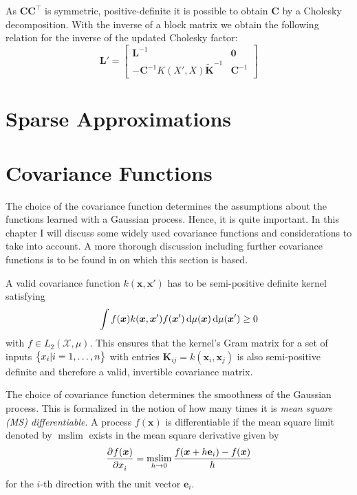 \documentclass[11pt,a4paper]{scrreprt}
\newcommand{\vc}[1]{\bm{#1}}
\newcommand{\vcc}[1]{\textbf{#1}}
\newcommand{\mat}[1]{\bm{#1}}
\newcommand{\T}{^{\top}}
\DeclareMathOperator*{\mslim}{mslim}
\newcommand{\newterm}[1]{\emph{#1}}
\begin{document}
As $\mat C \mat C\T$ is symmetric, positive-definite it is possible to obtain 
$\mat C$ by a Cholesky decomposition.
With the inverse of a block matrix \parencite[45]{Petersen:2008wc} we obtain the 
following relation for the inverse of the updated Cholesky factor:
\begin{equation}
    \mat L' = \left[
        \begin{array}{cc}
            \mat L^{-1} & \mat 0 \\ -\mat C^{-1} K(X', X)\tilde{\mat K}^{-1} 
            & \mat C^{-1}
        \end{array}
    \right]
\end{equation}

\section{Sparse Approximations}

\section{Covariance Functions}
The choice of the covariance function determines the assumptions about the 
functions learned with a Gaussian process. Hence, it is quite important. In this 
chapter I will discuss some widely used covariance functions and considerations 
to take into account. A more thorough discussion including further covariance 
functions is to be found in \textcite[Chapter 4]{Rasmussen:2006vz} on which this 
section is based.

A valid covariance function $k(\vc x, \vc x')$ has to be semi-positive definite 
kernel \parencite{Cressie:1993uu} satisfying
\begin{equation}
    \int f(\vc x) k(\vc x, \vc x') f(\vc x') \dif \mu(\vc x) \dif \mu(\vc x') 
    \geq 0
\end{equation}
with $f \in L_2(\mathcal{X}, \mu)$. This ensures that the kernel's Gram matrix 
for a set of inputs $\cbr{x_i | i = 1, \dots, n}$ with entries $\mat K_{ij} 
= k(\vc x_i, \vc x_j)$ is also semi-positive definite and therefore a valid, 
invertible covariance matrix.

The choice of covariance function determines the smoothness of the Gaussian 
process. This is formalized in the notion of how many times it is \newterm{mean 
    square (MS) differentiable}. A process $f(\vc x)$ is differentiable if the
mean square limit denoted by $\mslim$ exists in the mean square derivative given 
by
\begin{equation}
    \dpd{f(\vc x)}{x_i} = \mslim_{h \rightarrow 0} \frac{f(\vc x + h\vcc e_i) 
    - f(\vc x)}{h}
\end{equation}
for the $i$-th direction with the unit vector $\vcc e_i$.
\end{document}

